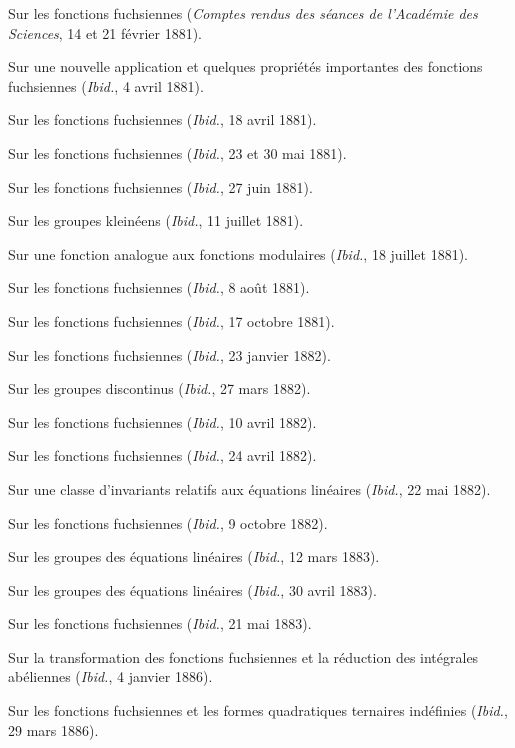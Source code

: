 \documentclass[11pt]{article}
\begin{document}
\begin{description}[leftmargin=3.4em,labelwidth=2.8em,style=nextline]
\item[6.] Sur les fonctions fuchsiennes (\emph{Comptes rendus des séances de l’Académie des Sciences}, 14 et 21 février 1881).
\item[9.] Sur une nouvelle application et quelques propriétés importantes des fonctions fuchsiennes (\emph{Ibid.}, 4 avril 1881).
\item[11.] Sur les fonctions fuchsiennes (\emph{Ibid.}, 18 avril 1881).
\item[13.] Sur les fonctions fuchsiennes (\emph{Ibid.}, 23 et 30 mai 1881).
\item[15.] Sur les fonctions fuchsiennes (\emph{Ibid.}, 27 juin 1881).
\item[16.] Sur les groupes kleinéens (\emph{Ibid.}, 11 juillet 1881).
\item[17.] Sur une fonction analogue aux fonctions modulaires (\emph{Ibid.}, 18 juillet 1881).
\item[18.] Sur les fonctions fuchsiennes (\emph{Ibid.}, 8 août 1881).
\item[19.] Sur les fonctions fuchsiennes (\emph{Ibid.}, 17 octobre 1881).
\item[22.] Sur les fonctions fuchsiennes (\emph{Ibid.}, 23 janvier 1882).
\item[25.] Sur les groupes discontinus (\emph{Ibid.}, 27 mars 1882).
\item[26.] Sur les fonctions fuchsiennes (\emph{Ibid.}, 10 avril 1882).
\item[27.] Sur les fonctions fuchsiennes (\emph{Ibid.}, 24 avril 1882).
\item[28.] Sur une classe d’invariants relatifs aux équations linéaires (\emph{Ibid.}, 22 mai 1882).
\item[30.] Sur les fonctions fuchsiennes (\emph{Ibid.}, 9 octobre 1882).
\item[34.] Sur les groupes des équations linéaires (\emph{Ibid.}, 12 mars 1883).
\item[36.] Sur les groupes des équations linéaires (\emph{Ibid.}, 30 avril 1883).
\item[37.] Sur les fonctions fuchsiennes (\emph{Ibid.}, 21 mai 1883).
\item[59.] Sur la transformation des fonctions fuchsiennes et la réduction des intégrales abéliennes (\emph{Ibid.}, 4 janvier 1886).
\item[61.] Sur les fonctions fuchsiennes et les formes quadratiques ternaires indéfinies (\emph{Ibid.}, 29 mars 1886).

\end{description}
\end{document}
